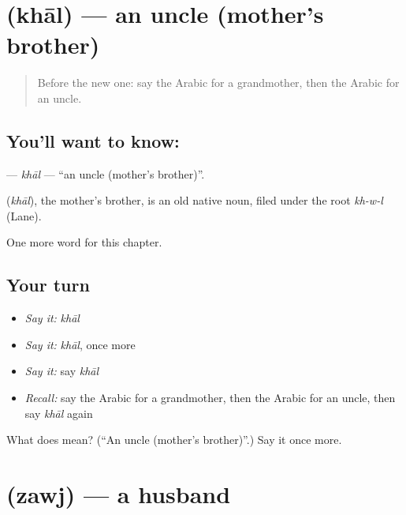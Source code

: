 \section[\texorpdfstring{\ar{خال} (khāl)}{خال (khāl)}]{ (khāl) — an uncle (mother's brother)}

\label{lesson:AR-C55-khal}



\begin{quote}
Before the new one: say the Arabic for a grandmother, then the Arabic for an uncle.
\end{quote}

\subsection*{You'll want to know: }
\textbf{} — \emph{khāl} — \textquotedblleft{}an uncle (mother's brother)\textquotedblright{}.

\begin{cousinweb}
\textbf{} (\emph{khāl}), the mother's brother, is an old native noun, filed under the root \emph{kh-w-l} (Lane).
\end{cousinweb}

\begin{grammarlens}[title={What you've built}]
One more word for this chapter.
\end{grammarlens}

\subsection*{Your turn}
\begin{itemize}
\raggedright
  \item \emph{Say it:} \emph{khāl}
  \item \emph{Say it:} \emph{khāl}, once more
  \item \emph{Say it:} say \emph{khāl}
  \item \emph{Recall:} say the Arabic for a grandmother, then the Arabic for an uncle, then say \emph{khāl} again
\end{itemize}

\begin{tcolorbox}[breakable,colback=teal!4,colframe=teal!35!black,title={Before you move on}]
What does  mean? (\textquotedblleft{}An uncle (mother's brother)\textquotedblright{}.) Say it once more.
\end{tcolorbox}
\section[\texorpdfstring{\ar{زوج} (zawj)}{زوج (zawj)}]{ (zawj) — a husband}

